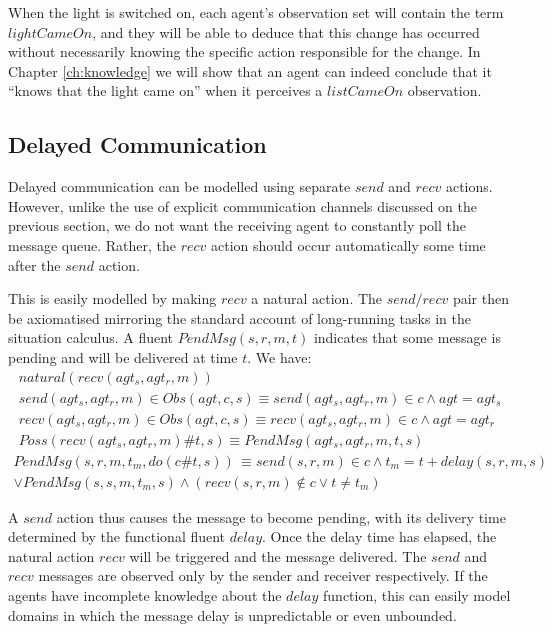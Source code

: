 When the light is switched on, each agent's observation set will contain
the term $lightCameOn$, and they will be able to deduce that this
change has occurred without necessarily knowing the specific action
responsible for the change. In Chapter \ref{ch:knowledge} we will
show that an agent can indeed conclude that it {}``knows that the
light came on'' when it perceives a $listCameOn$ observation.


\subsection{Delayed Communication}

Delayed communication can be modelled using separate $send$ and $recv$
actions. However, unlike the use of explicit communication channels
discussed on the previous section, we do not want the receiving agent
to constantly poll the message queue. Rather, the $recv$ action should
occur automatically some time after the $send$ action.

This is easily modelled by making $recv$ a natural action. The $send/recv$
pair then be axiomatised mirroring the standard account of long-running
tasks in the situation calculus. A fluent $PendMsg(s,r,m,t)$ indicates
that some message is pending and will be delivered at time $t$. We
have:\begin{gather*}
natural(recv(agt_{s},agt_{r},m))\\
send(agt_{s},agt_{r},m)\in Obs(agt,c,s)\equiv send(agt_{s},agt_{r},m)\in c\wedge agt=agt_{s}\\
recv(agt_{s},agt_{r},m)\in Obs(agt,c,s)\equiv recv(agt_{s},agt_{r},m)\in c\wedge agt=agt_{r}\\
Poss(recv(agt_{s},agt_{r},m)\#t,s)\equiv PendMsg(agt_{s},agt_{r},m,t,s)\end{gather*}
 \begin{multline*}
PendMsg(s,r,m,t_{m},do(c\#t,s))\,\equiv send(s,r,m)\in c\wedge t_{m}=t+delay(s,r,m,s)\\
\vee PendMsg(s,s,m,t_{m},s)\wedge\left(recv(s,r,m)\not\in c\vee t\neq t_{m}\right)\end{multline*}


A $send$ action thus causes the message to become pending, with its
delivery time determined by the functional fluent $delay$. Once the
delay time has elapsed, the natural action $recv$ will be triggered
and the message delivered. The $send$ and $recv$ messages are observed
only by the sender and receiver respectively. If the agents have incomplete
knowledge about the $delay$ function, this can easily model domains
in which the message delay is unpredictable or even unbounded.


